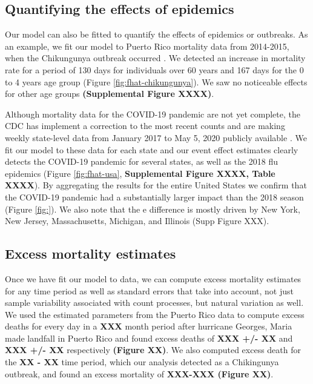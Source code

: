 \documentclass[11pt]{article}
\begin{document}
\subsection{Quantifying the effects of epidemics}
\label{subsec:epidemics}
Our model can also be fitted to quantify the effects of epidemics or outbreaks. As an example, 
we fit our model to Puerto Rico mortality data from 2014-2015, when the Chikungunya outbreak occurred \cite{sharp2016surveillance, hsu2019risk}. We detected an increase in mortality rate for a period of 130 days for individuals over 60 years and 167 days for the 0 to 4 years age group (Figure \ref{fig:fhat-chikungunya}). We saw no noticeable effects for other age groups \textbf{(Supplemental Figure XXXX)}.

Although mortality data for the COVID-19 pandemic are not yet complete, the CDC has implement a correction to the most recent counts and are making weekly state-level data from January 2017 to May 5, 2020 publicly available \cite{cdc2020covid19}. We fit our model to these data for each state and our event effect estimates clearly detects the COVID-19 pandemic for several states, as well as the 2018 flu epidemics (Figure \ref{fig:fhat-usa}, \textbf{Supplemental Figure XXXX, Table XXXX}). By aggregating the results for the entire United States we confirm that the COVID-19 pandemic had a substantially larger impact than the 2018 season (Figure \ref{fig:}). We also note that the e difference is mostly driven by New York, New Jersey, Massachusetts, Michigan, and Illinois (Supp Figure XXX).

\subsection{Excess mortality estimates}
\label{subsec:excess-mortality}
Once we have fit our model to data, we can compute excess mortality estimates for any time period as well as standard errors that take into account, not just sample variability associated with count processes, but natural variation as well. We used the estimated parameters from the Puerto Rico data to compute excess deaths for every day in a \textbf{XXX} month period after hurricane Georges, Maria made landfall in Puerto Rico and found excess deaths of \textbf{XXX +/- XX} and \textbf{XXX +/- XX} respectively \textbf{(Figure XX)}. We also computed excess death for the \textbf{XX - XX} time period, which our analysis detected as a Chikingunya outbreak, and found an excess mortality of \textbf{XXX-XXX (Figure XX)}. \\ 
\end{document}
